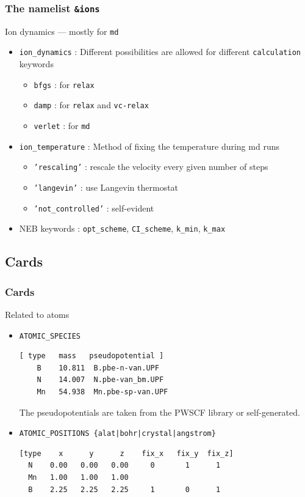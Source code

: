 \documentclass[]{beamer}
\def\t#1{{\texttt{#1}}}
\begin{document}
\begin{frame}
\frametitle{The namelist \t{\&ions}}
\begin{block}{Ion dynamics --- mostly for \t{md}}
  \begin{itemize}
  \item \t{ion\_dynamics} : Different possibilities are allowed for
    different \t{calculation} keywords
    \begin{itemize}
    \item[] \t{bfgs} : for \t{relax}
    \item[] \t{damp} : for \t{relax} and \t{vc-relax}
    \item[] \t{verlet} : for \t{md}
    \end{itemize}
\item \t{ion\_temperature} : Method of fixing the temperature during md runs
  \begin{itemize}
    \item[]\t{'rescaling'} : rescale the velocity every given number of steps
    \item[]\t{'langevin'} : use Langevin thermostat
    \item[]\t{'not\_controlled'} : self-evident
  \end{itemize}
\item NEB keywords : \t{opt\_scheme}, \t{CI\_scheme}, \t{k\_min}, \t{k\_max}
\end{itemize}
\end{block}
\end{frame}

\subsection{Cards}
\begin{frame}[fragile] 
\frametitle{Cards}
\begin{block}{Related to atoms}
\begin{itemize}
\item<1-> \t{ATOMIC\_SPECIES} \\
\begin{verbatim}
[ type   mass   pseudopotential ]
    B    10.811  B.pbe-n-van.UPF
    N    14.007  N.pbe-van_bm.UPF
    Mn   54.938  Mn.pbe-sp-van.UPF
\end{verbatim}
The pseudopotentials are taken from the PWSCF library or self-generated.
\item<2-> \t{ATOMIC\_POSITIONS \{alat|bohr|crystal|angstrom\}}

\begin{verbatim}
[type    x      y      z    fix_x   fix_y  fix_z]
  N    0.00   0.00   0.00     0       1      1
  Mn   1.00   1.00   1.00     
  B    2.25   2.25   2.25     1       0      1  
\end{verbatim}
\end{itemize}
\end{block}
\end{frame}
\end{document}
